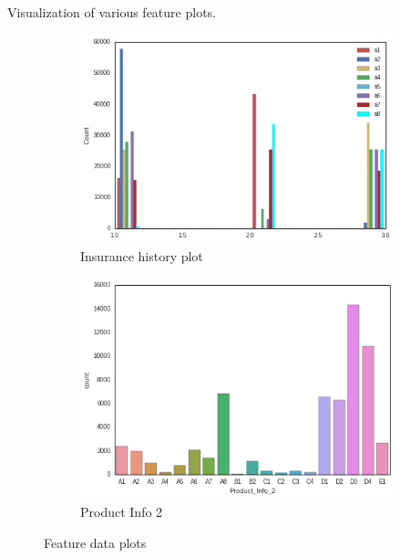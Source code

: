 Visualization of various feature plots.
\begin{figure}[hh!]
  \centering
  \begin{subfigure}[b]{0.4\textwidth}
     \includegraphics[width=\textwidth]{Insurancehist.png}
     \caption{Insurance history plot}
     \label{imbalance}
  \end{subfigure}
  \quad
   \begin{subfigure}[b]{0.4\textwidth}
      \includegraphics[width=\textwidth]{categoricalplot.png}
      \caption{Product Info 2}   
   \end{subfigure}
   \caption{Feature data plots}
\end{figure}

